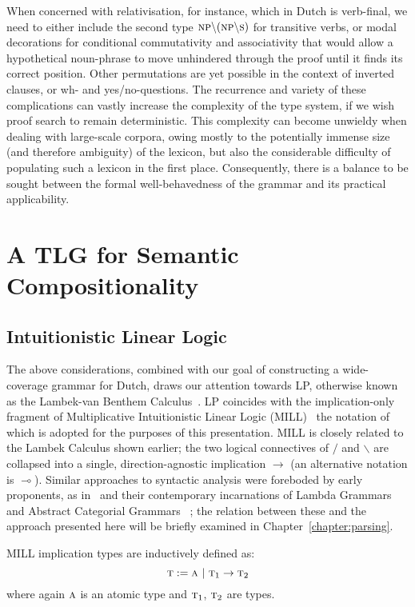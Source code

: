 When concerned with relativisation, for instance, which in Dutch is verb-final, we need to either include the second type $\textsc{np}\backslash(\textsc{np}\backslash\textsc{s})$ for transitive verbs, or modal decorations for conditional commutativity and associativity that would allow a hypothetical noun-phrase to move unhindered through the proof until it finds its correct position.
Other permutations are yet possible in the context of inverted clauses, or wh- and yes/no-questions.
The recurrence and variety of these complications can vastly increase the complexity of the type system, if we wish proof search to remain deterministic.
This complexity can become unwieldy when dealing with large-scale corpora, owing mostly to the potentially immense size (and therefore ambiguity) of the lexicon, but also the considerable difficulty of populating such a lexicon in the first place.
Consequently, there is a balance to be sought between the formal well-behavedness of the grammar and its practical applicability.

\section{A TLG for Semantic Compositionality}
\subsection{Intuitionistic Linear Logic}
The above considerations, combined with our goal of constructing a wide-coverage grammar for Dutch, draws our attention towards LP, otherwise known as the Lambek-van Benthem Calculus~\cite{van1988semantics}.
LP coincides with the implication-only fragment of Multiplicative Intuitionistic Linear Logic (MILL)~\cite{girard1987linear} the notation of which is adopted for the purposes of this presentation.
MILL is closely related to the Lambek Calculus shown earlier; the two logical connectives of $/$ and $\backslash$ are collapsed into a single, direction-agnostic implication $\rightarrow$ (an alternative notation is $\multimap$).
Similar approaches to syntactic analysis were foreboded by early proponents, as in~\cite{curry1961some} and their contemporary incarnations of Lambda Grammars~\cite{muskens2001lambda} and Abstract Categorial Grammars ~\cite{de2001towards}; the relation between these and the approach presented here will be briefly examined in Chapter~\ref{chapter:parsing}. 

MILL implication types are inductively defined as:
\[
\textsc{t} := \textsc{a} \ | \ \textsc{t}_1 \to \textsc{t}_2 
\]
where again $\textsc{a}$ is an atomic type and $\textsc{t}_1$, $\textsc{t}_2$ are types.

